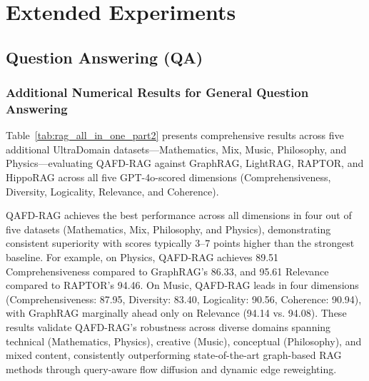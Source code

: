 \documentclass{article} %
\begin{document}
\section{Extended Experiments}



\subsection{Question Answering (QA)}

\subsubsection{Additional Numerical Results for General Question Answering}
\label{app:add_results}
Table~\ref{tab:rag_all_in_one_part2} presents comprehensive results across five additional UltraDomain datasets—Mathematics, Mix, Music, Philosophy, and Physics—evaluating QAFD-RAG against GraphRAG, LightRAG, RAPTOR, and HippoRAG across all five GPT-4o-scored dimensions (Comprehensiveness, Diversity, Logicality, Relevance, and Coherence). 

QAFD-RAG achieves the best performance across all dimensions in four out of five datasets (Mathematics, Mix, Philosophy, and Physics), demonstrating consistent superiority with scores typically 3–7 points higher than the strongest baseline. For example, on Physics, QAFD-RAG achieves 89.51 Comprehensiveness compared to GraphRAG's 86.33, and 95.61 Relevance compared to RAPTOR's 94.46. On Music, QAFD-RAG leads in four dimensions (Comprehensiveness: 87.95, Diversity: 83.40, Logicality: 90.56, Coherence: 90.94), with GraphRAG marginally ahead only on Relevance (94.14 vs. 94.08). These results validate QAFD-RAG's robustness across diverse domains spanning technical (Mathematics, Physics), creative (Music), conceptual (Philosophy), and mixed content, consistently outperforming state-of-the-art graph-based RAG methods through query-aware flow diffusion and dynamic edge reweighting.
\end{document}
